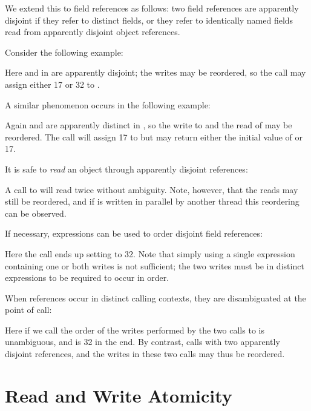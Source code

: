 We extend this to field references as follows: two field references
are apparently disjoint if they refer to distinct fields, or they
refer to identically named fields read from apparently disjoint object
references.

Consider the following example:

Here  and  in  are
apparently disjoint; the writes may be reordered, so the call
 may assign either 17 or 32 to .

A similar phenomenon occurs in the following example:

Again  and  are apparently distinct in , so the
write to  and the read of  may be reordered.
The call  will assign 17 to  but may return
either the initial value of  or 17.

It is safe to \emph{read} an object through apparently disjoint references:

A call to  will read  twice without ambiguity.
Note, however, that the reads may still be reordered, and if
 is written in parallel by another thread this reordering
can be observed.

If necessary,  expressions can be used to order disjoint field
references:

Here the call  ends up setting  to
32.  Note that simply using a single  expression
containing one or both writes is not sufficient;
the two writes must be in distinct  expressions
to be required to occur in order.

When references occur in distinct calling contexts, they are
disambiguated at the point of call:

Here if we call  the order of the writes performed by the
two calls to  is unambiguous, and  is 32 in the end.
By contrast,  calls  with two apparently disjoint
references, and the writes in these two calls may thus be reordered.


\section{Read and Write Atomicity}

